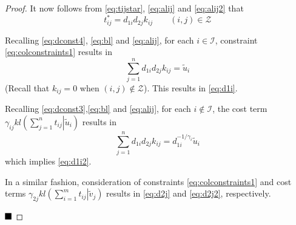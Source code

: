 \documentclass[10pt,a4paper]{amsart}
\def\qed{ \rule{.1in}{.1in}}
\begin{document}
\begin{proof}
It now follows from \eqref{eq:tijstar}, \eqref{eq:alij} and \eqref{eq:alij2} that
\[
t^*_{ij} = d_{1i}d_{2j} k_{ij} \qquad (i, j) \in \mathcal{Z}
\]


Recalling \eqref{eq:dconst4}, \eqref{eq:bl} and \eqref{eq:alij}, for each  $i \in \mathcal{I}$, constraint \eqref{eq:colconstraints1} results in
\[
\sum_{j=1}^n d_{1i}d_{2j}k_{ij} =\tilde{u}_i
\]
(Recall that $k_{ij} =0$ when $(i,j)\notin \mathcal{Z}$).
This 
 results in 
\eqref{eq:d1i}.

Recalling \eqref{eq:dconst3},\eqref{eq:bl} and \eqref{eq:alij}, for each  $i \notin \mathcal{I}$, 
the cost term $
\gamma_{ij} kl\left(\left. \sum_{j=1}^n  t_{ij} \right| \tilde{u}_i\right) $
results in
\[
\sum_{j=1}^n d_{1i}d_{2j}k_{ij} =d_{1i}^{-1/\gamma_i}\tilde{u}_i
\]
which implies 
\eqref{eq:d1i2}.

In a similar fashion, consideration of constraints \eqref{eq:colconstraints1} and cost terms $\gamma_{2j} kl\left(\left. \sum_{i=1}^m  t_{ij} \right| \tilde{v}_j\right) $
results in 
\eqref{eq:d2j} and \eqref{eq:d2j2}, respectively.

\hfill
$\qed$
\end{proof}
\end{document}
